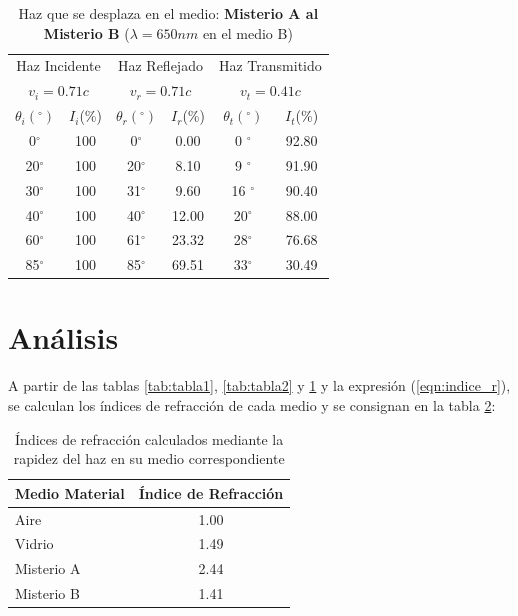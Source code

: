 \documentclass[
aps,
reprint,
amsmath, amssymb,
superscriptaddress,
]{revtex4-2}
\begin{document}
\begin{table}[H]%
    \caption{\label{tab:tabla3}Haz que se desplaza en el medio: \textbf{Misterio A al Misterio B} ($\lambda=650nm$ en el medio B)}
     \begin{ruledtabular}
     \begin{tabular}{cc|cc|cc}
        \multicolumn{2}{c}{Haz Incidente}  & \multicolumn{2}{c}{Haz Reflejado} & \multicolumn{2}{c}{Haz Transmitido} \\
        \multicolumn{2}{c}{$v_i = 0.71c$}  & \multicolumn{2}{c}{$v_r= 0.71c$} & \multicolumn{2}{c}{$v_t=0.41c$} \\
        \hline
        $\theta_i (^{\circ})$   & $I_{i}$(\%) & $\theta_r(^{\circ})$ & $I_{r}$(\%) & $\theta_t(^{\circ})$ & $I_{t}$(\%)\\
         0$^{\circ}$ & 100 &  0$^{\circ}$ &  0.00 & 0 $^{\circ}$ & 92.80 \\
        20$^{\circ}$ & 100 & 20$^{\circ}$ &  8.10 & 9 $^{\circ}$ & 91.90 \\
        30$^{\circ}$ & 100 & 31$^{\circ}$  & 9.60 & 16 $^{\circ}$ &90.40 \\
        40$^{\circ}$ & 100 & 40$^{\circ}$ & 12.00 & 20$^{\circ}$ & 88.00\\
        60$^{\circ}$ & 100 & 61$^{\circ}$ & 23.32 & 28$^{\circ}$ & 76.68\\
        85$^{\circ}$ & 100 & 85$^{\circ}$ & 69.51 & 33$^{\circ}$ & 30.49 \\
        \end{tabular}
     \end{ruledtabular}
\end{table}


\section{Análisis}

A partir de las tablas \ref{tab:tabla1}, \ref{tab:tabla2} y \ref{tab:tabla3} y la expresión (\ref{eqn:indice_r}), se calculan los índices de refracción de cada medio y se consignan en la tabla \ref{tab:indices}:

\begin{table}[H]%
    \caption{\label{tab:indices}Índices de refracción calculados mediante la rapidez del haz en su medio correspondiente}
     \begin{ruledtabular}
     \begin{tabular}{lc}
      Medio Material & Índice de Refracción\\
      \hline
      Aire & 1.00\\
      Vidrio & 1.49\\
      Misterio A & 2.44\\
      Misterio B & 1.41
        \end{tabular}
     \end{ruledtabular}
\end{table}
\end{document}
